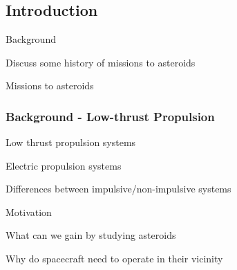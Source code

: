 
\section*{}
\subsection*{Introduction}  

\begin{frame}{Background } %

Discuss some history of missions to asteroids

Missions to asteroids

\end{frame}   %

\begin{frame}[t]\frametitle{Background - Low-thrust Propulsion}
    Low thrust propulsion systems

    Electric propulsion systems

    Differences between impulsive/non-impulsive systems
\end{frame}

\begin{frame}[t]{Motivation}
    
What can we gain by studying asteroids

Why do spacecraft need to operate in their vicinity


\end{frame}


